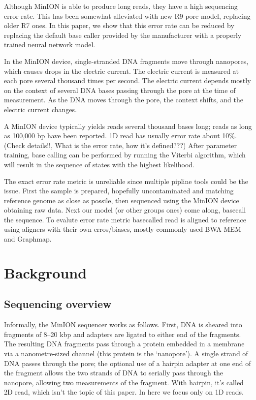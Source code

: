 \documentclass[times, utf8, seminar, numeric]{fer}
\begin{document}
Although MinION is able to produce long reads, they have a high sequencing error rate. This has been somewhat alleviated with new R9 pore model, replacing older R7 ones. In this paper, we show that this error rate can be reduced by replacing the default base caller provided by the manufacturer with a properly trained neural network model.

In the MinION device, single-stranded DNA fragments move through nanopores, which causes drops in the electric current. The electric current is measured at each pore several thousand times per second. The electric current depends mostly on the context of several DNA bases passing through the pore at the time of measurement. As the DNA moves through the pore, the context shifts, and the electric current changes.

A MinION device typically yields reads several thousand bases long; reads as long as 100,000 bp have been reported. 1D read has usually error rate about   10\%. (Check details!!, What is the error rate, how it's defined???) After parameter training, base calling can be performed by running the Viterbi algorithm, which will result in the sequence of states with the highest likelihood.

The exact error rate metric is unreliable since multiple pipline tools could be the issue. First the sample is prepared, hopefully uncontaminated and matching reference genome as close as possile, then sequenced using the MinION device obtaining raw data. Next our model (or other groups ones) come along, basecall the sequence. To evalute error rate metric basecalled read is aligned to reference using aligners with their own erros/biases, mostly commonly used BWA-MEM and Graphmap.

\chapter{Background}

\section{Sequencing overview}
Informally, the MinION sequencer works as follows. First, DNA is sheared into fragments of 8–20 kbp and adapters are ligated to either end of the fragments. The resulting DNA fragments pass through a protein embedded in a membrane via a nanometre-sized channel (this protein is the `nanopore'). A single strand of DNA passes through the pore; the optional use of a hairpin adapter at one end of the fragment allows the two strands of DNA to serially pass through the nanopore, allowing two measurements of the fragment. With hairpin, it's called 2D read, which isn't the topic of this paper. In here we focus only on 1D reads.
\end{document}
